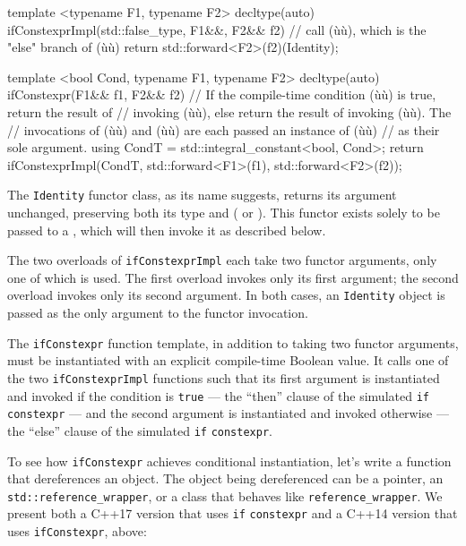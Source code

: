 {\begin{emcppslisting}
template <typename F1, typename F2>
decltype(auto) ifConstexprImpl(std::false_type, F1&&, F2&& f2)
    // call (ù{}ù), which is the "else" branch of (ù{}ù)
{
    return std::forward<F2>(f2)(Identity{});
}

template <bool Cond, typename F1, typename F2>
decltype(auto) ifConstexpr(F1&& f1, F2&& f2)
    // If the compile-time condition (ù{}ù) is true, return the result of
    // invoking (ù{}ù), else return the result of invoking (ù{}ù).  The
    // invocations of (ù{}ù) and (ù{}ù) are each passed an instance of (ù{}ù)
    // as their sole argument.
{
    using CondT = std::integral_constant<bool, Cond>;
    return ifConstexprImpl(CondT{}, std::forward<F1>(f1), std::forward<F2>(f2));
}
\end{emcppslisting}
    

\noindent The \lstinline!Identity! functor class, as its name suggests, returns its
argument unchanged, preserving both its type and 
( or ). This functor exists solely to be
passed to a , which will then invoke it as
described below.

The two overloads of \lstinline!ifConstexprImpl! each take two functor
arguments, only one of which is used. The first overload invokes only
its first argument; the second overload invokes only its second
argument. In both cases, an \lstinline!Identity! object is passed as the
only argument to the functor invocation.

The \lstinline!ifConstexpr! function template, in addition to taking two
functor arguments, must be instantiated with an explicit compile-time
Boolean value. It calls one of the two \lstinline!ifConstexprImpl!
functions such that its first argument is instantiated and invoked if
the condition is \lstinline!true! --- the ``then'' clause of the simulated
\lstinline!if! \lstinline!constexpr! --- and the second argument is
instantiated and invoked otherwise --- the ``else'' clause of the
simulated \lstinline!if! \lstinline!constexpr!.

To see how \lstinline!ifConstexpr! achieves conditional instantiation,
let's write a function that dereferences an object. The object being
dereferenced can be a pointer, an \lstinline!std::reference_wrapper!, or a
class that behaves like \lstinline!reference_wrapper!. We present both a
C++17 version that uses \lstinline!if! \lstinline!constexpr! and a C++14
version that uses \lstinline!ifConstexpr!, above:

}
